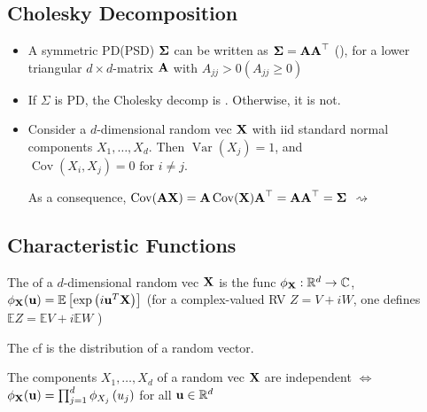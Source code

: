 \subsection*{Cholesky Decomposition}
\begin{itemize}[leftmargin=*]
    \item A symmetric PD(PSD) $\boldsymbol{\mathbf{\Sigma}}$ can be written as
$\boldsymbol{\mathbf{\Sigma}}=\boldsymbol{\mathbf{AA}}^{\top}$ (), 
for a lower triangular $d \times d$-matrix $\boldsymbol{\mathbf{A}}$ with $A_{j j}>0\left(A_{j j} \geq 0\right)$
    \item If $\Sigma$ is PD, the Cholesky decomp is . Otherwise, it is not.
    \item Consider a $d$-dimensional random vec $\boldsymbol{\mathbf{X}}$ with iid standard normal components $X_{1}, \ldots, X_{d}$. Then
$
\operatorname{Var}\left(X_{j}\right)=1$, and $\operatorname{Cov}\left(X_{i}, X_{j}\right)=0 \text { for } i \neq j .
$

As a consequence, $\operatorname{Cov}(\boldsymbol{\mathbf{AX}})=\boldsymbol{\mathbf{A}} \operatorname{Cov}(\boldsymbol{\mathbf{X}}) \boldsymbol{\mathbf{A}}^{\top}=\boldsymbol{\mathbf{AA}}^{\top}=\boldsymbol{\mathbf{\Sigma}}$
$\rightsquigarrow$ 
\end{itemize}





\subsection*{Characteristic Functions}
The  of a $d$-dimensional random vec $\boldsymbol{\mathbf{X}}$ is the func $\phi_{\boldsymbol{\mathbf{X}}}: \mathbb{R}^{d} \rightarrow \mathbb{C}$,
$
\phi_{\boldsymbol{\mathbf{X}}}(\boldsymbol{\mathbf{u}})=\mathbb{E}\left[\exp \left(i \boldsymbol{\mathbf{u}}^{T} \boldsymbol{\mathbf{X}}\right)\right]
$
(for a complex-valued RV $Z=V+i W$, one defines $\mathbb{E} Z=\mathbb{E} V+i \mathbb{E} W$ )


The cf is  the distribution of a random vector.

The components $X_{1}, \ldots, X_{d}$ of a random vec $\boldsymbol{\mathbf{X}}$ are independent $\Leftrightarrow$
$
\phi_{\boldsymbol{\mathbf{X}}}(\boldsymbol{\mathbf{u}})=\prod_{j=1}^{d} \phi_{X_{j}}\left(u_{j}\right)$ for all $ \boldsymbol{\mathbf{u}} \in \mathbb{R}^{d}
$






